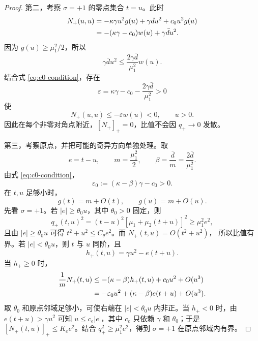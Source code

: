 \documentclass[UTF8,a4paper,12pt]{ctexart}
\newcommand{\abs}[1]{\left\lvert #1\right\rvert}
\begin{document}
\begin{proof}
第二，考察 $\sigma=+1$ 的零点集合 $t=u$。此时
\begin{align}
 N_+(u,u)
 &= -\kappa\gamma u^2g(u)+\gamma\bar d u^2+c_0u^2g(u)\notag\\
 &=-(\kappa\gamma-c_0)w(u)+\gamma\bar d u^2.
\end{align}
因为 $g(u)\ge\mu_1^2/2$，所以
\begin{equation}
 \gamma\bar d u^2\le\frac{2\gamma\bar d}{\mu_1^2}w(u).
\end{equation}
结合式 \eqref{eq:c0-condition}，存在
\begin{equation}
 \varepsilon=\kappa\gamma-c_0-\frac{2\gamma\bar d}{\mu_1^2}>0
\end{equation}
使
\begin{equation}
 N_+(u,u)\le-\varepsilon w(u)<0,\qquad u>0.
\end{equation}
因此在每个非零对角点附近，$[N_+]_+=0$，比值不会因 $q_+\to0$ 发散。

第三，考察原点，并把可能的奇异方向单独处理。取
\begin{equation}
 e=t-u,\qquad m=\frac{\mu_1^2}{2},\qquad
 \beta=\frac{\bar d}{m}=\frac{2\bar d}{\mu_1^2}.
\end{equation}
由式 \eqref{eq:c0-condition}，
\begin{equation}
 \varepsilon_0:=(\kappa-\beta)\gamma-c_0>0.
\label{eq:eps0-origin}
\end{equation}
在 $t,u$ 足够小时，
\begin{equation}
 g(t)=m+O(t),\qquad g(u)=m+O(u).
\end{equation}
先看 $\sigma=+1$。若 $\abs e\ge\theta_0u$，其中
$\theta_0>0$ 固定，则
\begin{equation}
 q_+(t,u)^2
 =(t-u)^2[\mu_1+\mu_2(t+u)]^2
 \ge \mu_1^2 e^2,
\end{equation}
且由 $\abs e\ge\theta_0u$ 可得
$t^2+u^2\le C_{\theta}e^2$。而 $N_+(t,u)=O(t^2+u^2)$，
所以比值有界。若
$\abs e<\theta_0u$，则 $t$ 与 $u$ 同阶，且
\begin{equation}
 h_+(t,u)=\gamma u^2-e(t+u).
\end{equation}
当 $h_+\ge0$ 时，
\begin{align}
 \frac{1}{m}N_+(t,u)
 &\le-(\kappa-\beta)h_+(t,u)+c_0u^2+O(u^3) \notag\\
 &=-\varepsilon_0u^2+(\kappa-\beta)e(t+u)+O(u^3).
\end{align}
取 $\theta_0$ 和原点邻域足够小，可使右端在
$\abs e<\theta_0u$ 内非正。当 $h_+<0$ 时，由
$e(t+u)>\gamma u^2$ 可知 $u\le c_e\abs e$，其中 $c_e$ 只依赖
$\gamma$ 和 $\theta_0$；于是
$[N_+(t,u)]_+\le K_e e^2$。结合
$q_+^2\ge\mu_1^2e^2$，得到 $\sigma=+1$ 在原点邻域内有界。


\end{proof}
\end{document}
